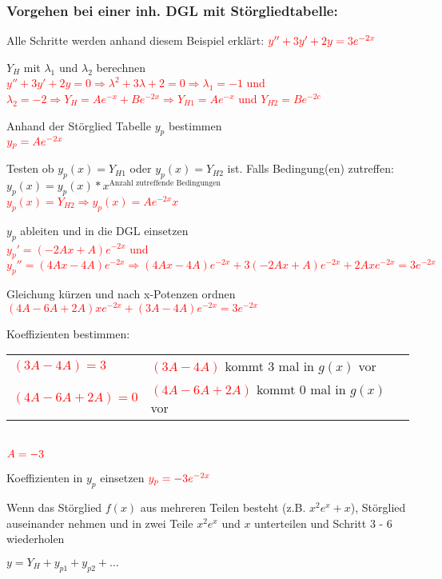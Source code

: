 \subsubsection{Vorgehen bei einer inh. DGL mit Störgliedtabelle: }
	Alle Schritte werden anhand diesem Beispiel erklärt: $\textcolor{red}{y'' + 3y' + 2y = 3e^{-2x}}$
	\begin{compactenum}
		\item 	$Y_H$ mit $\lambda_1$ und $\lambda_2$ berechnen \\
				\textcolor{red}{$y'' + 3y' + 2y = 0 \Rightarrow \lambda^2 + 3\lambda + 2 = 0 \Rightarrow \lambda_1 = -1$ und $\lambda_2 = -2 \Rightarrow Y_H = Ae^{-x} + Be^{-2x} \Rightarrow Y_{H1} = Ae^{-x}$ und $ Y_{H2} = Be^{-2c}$}
		\item 	Anhand der Störglied Tabelle $y_p$ bestimmen \\
				$\textcolor{red}{y_p = Ae^{-2x}}$
		\item 	Testen ob $y_p(x) = Y_{H1}$ oder $y_p(x) = Y_{H2}$ ist. 
				Falls Bedingung(en) zutreffen: $y_p(x)= y_p(x) * x^{\text{Anzahl zutreffende Bedingungen}}$ \\
				\textcolor{red}{$ y_p(x) = Y_{H2} \Rightarrow y_p(x) = Ae^{-2x}x $}
		\item 	$y_p$ ableiten und in die DGL einsetzen \\
				\textcolor{red}{$y_p'=(-2Ax + A)e^{-2x}$ und $y_p''=(4Ax - 4A)e^{-2x} \Rightarrow (4Ax - 4A)e^{-2x} + 3(-2Ax + A)e^{-2x} + 2Axe^{-2x} = 3e^{-2x}$}
		\item Gleichung kürzen und nach x-Potenzen ordnen \\
				\textcolor{red}{$(4A - 6A + 2A)xe^{-2x} + (3A - 4A)e^{-2x}=3e^{-2x}$}
		\item 	Koeffizienten bestimmen: \\				
				\begin{tabular}{ll}
					\textcolor{red}{$(3A - 4A) = 3$} & \textcolor{red}{$(3A - 4A)$} kommt 3 mal in $g(x)$ vor \\
					\textcolor{red}{$(4A - 6A + 2A) = 0$} & \textcolor{red}{$(4A - 6A + 2A)$} kommt 0 mal in $g(x)$ vor \\
				\end{tabular} \\
				$\textcolor{red}{A = -3}$
		\item 	Koeffizienten in $y_p$ einsetzen
				$\textcolor{red}{y_p = -3e^{-2x}}$
		\item 	Wenn das Störglied $f(x)$ aus mehreren Teilen besteht (z.B. $x^2e^x + x$), Störglied auseinander nehmen und in zwei Teile $x^2e^x$ und $x$ unterteilen und Schritt 3 - 6 wiederholen
		\item 	$y = Y_H + y_{p1} + y_{p2} + \dots$
	\end{compactenum}
	
